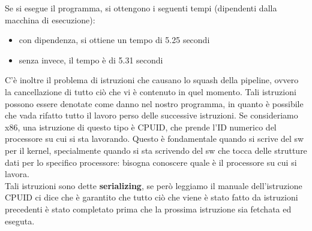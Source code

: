 \documentclass[14pt, oneside]{book}
\begin{document}
Se si esegue il programma, si ottengono i seguenti tempi (dipendenti dalla macchina di esecuzione):
\begin{itemize}
\item con dipendenza, si ottiene un tempo di 5.25 secondi
\item senza invece, il tempo è di 5.31 secondi
\end{itemize}
C'è inoltre il problema di istruzioni che causano lo squash della pipeline, ovvero la cancellazione di tutto ciò che vi è contenuto in quel momento. Tali istruzioni possono essere denotate come danno nel nostro programma, in quanto è possibile che vada rifatto tutto il lavoro perso delle successive istruzioni. Se consideriamo x86, una istruzione di questo tipo è \textsf{CPUID}, che prende l'ID numerico del processore su cui si sta lavorando. Questo è fondamentale quando si scrive del sw per il kernel, specialmente quando si sta scrivendo del sw che tocca delle strutture dati per lo specifico processore: bisogna conoscere quale è il processore su cui si lavora.\\ Tali istruzioni sono dette \textbf{serializing}, se però leggiamo il manuale dell'istruzione CPUID ci dice che è garantito che tutto ciò che viene è stato fatto da istruzioni precedenti è stato completato prima che la prossima istruzione sia fetchata ed eseguta.
\end{document}
